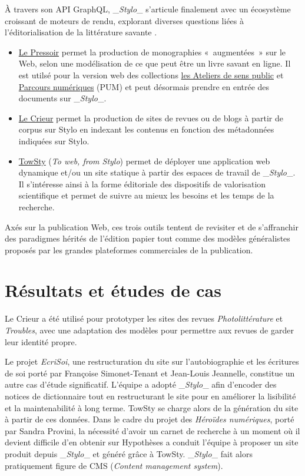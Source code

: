\documentclass[final, fra]{anthology-ch}      %
\begin{document}
À travers son API GraphQL, \_\emph{Stylo}\_ s'articule finalement avec
un écosystème croissant de moteurs de rendu, explorant diverses
questions liées à l'éditorialisation de la littérature savante
\cite{vitali-rosatiWhatEditorialization2016}.

\begin{itemize}
\item
  \href{https://pressoir.org/}{Le Pressoir} permet la production de
  monographies «~augmentées~» sur le Web, selon une modélisation de ce
  que peut être un livre savant en ligne. Il est utilsé pour la version
  web des collections \href{https://ateliers.sens-public.org/}{les
  Ateliers de sens public} et
  \href{https://www.parcoursnumeriques-pum.ca/}{Parcours numériques}
  (PUM) et peut désormais prendre en entrée des documents sur
  \_\emph{Stylo}\_.
\item
  \href{https://crieur.org/}{Le Crieur} permet la production de sites de
  revues ou de blogs à partir de corpus sur Stylo en indexant les
  contenus en fonction des métadonnées indiquées sur Stylo.
\item
  \href{https://gitlab.huma-num.fr/ceen/towsty/towsty.jl}{TowSty}
  (\emph{To web, from Stylo}) permet de déployer une application web
  dynamique et/ou un site statique à partir des espaces de travail de
  \_\emph{Stylo}\_. Il s'intéresse ainsi à la forme éditoriale des
  dispositifs de valorisation scientifique et permet de suivre au mieux
  les besoins et les temps de la recherche.
\end{itemize}

Axés sur la publication Web, ces trois outils tentent de revisiter et de
s'affranchir des paradigmes hérités de l'édition papier tout comme des
modèles généralistes proposés par les grandes plateformes commerciales
de la publication.

\section{Résultats et études de
cas}\label{ruxe9sultats-et-uxe9tudes-de-cas}

Le Crieur a été utilisé pour prototyper les sites des revues
\emph{Photolittérature} et \emph{Troubles}, avec une adaptation des
modèles pour permettre aux revues de garder leur identité propre.

Le projet \emph{EcriSoi}, une restructuration du site sur
l'autobiographie et les écritures de soi porté par Françoise
Simonet-Tenant et Jean-Louis Jeannelle, constitue un autre cas d'étude
significatif. L'équipe a adopté \_\emph{Stylo}\_ afin d'encoder des
notices de dictionnaire tout en restructurant le site pour en améliorer
la lisibilité et la maintenabilité à long terme. TowSty se charge alors
de la génération du site à partir de ces données. Dans le cadre du
projet des \emph{Héroïdes numériques}, porté par Sandra Provini, la
nécessité d'avoir un carnet de recherche à un moment où il devient
difficile d'en obtenir sur Hypothèses a conduit l'équipe à proposer un
site produit depuis \_\emph{Stylo}\_ et généré grâce à TowSty.
\_\emph{Stylo}\_ fait alors pratiquement figure de CMS (\emph{Content
management system}).
\end{document}
